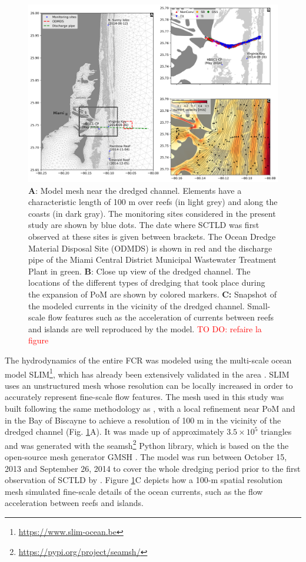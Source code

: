 \documentclass[preprint,12pt,authoryear]{elsarticle}
\newcommand{\todo}[1]{\textcolor{red}{TO DO: #1}}
\begin{document}
\begin{figure}
    \centering
    \includegraphics[width=\textwidth]{figures/fig_mesh_onset.png}
    \caption{\textbf{A}: Model mesh near the dredged channel. Elements have a characteristic length of 100 m over reefs (in light grey) and along the coasts (in dark gray). The monitoring sites considered in the present study are shown by blue dots. The date where SCTLD was first observed at these sites is given between brackets. The Ocean Dredge Material Disposal Site (ODMDS) is shown in red and the discharge pipe of the Miami Central District Municipal Wastewater Treatment Plant in green. \textbf{B}: Close up view of the dredged channel. The locations of the different types of dredging that took place during the expansion of PoM are shown by colored markers. \textbf{C:} Snapshot of the modeled currents in the vicinity of the dredged channel. Small-scale flow features such as the acceleration of currents between reefs and islands are well reproduced by the model. \todo{refaire la figure}}
    \label{fig:onset_mesh}
\end{figure}

The hydrodynamics of the entire FCR was modeled using the multi-scale ocean model SLIM\footnote{\url{ https://www.slim-ocean.be}}, which has already been extensively validated in the area \citep{frys20,dobbelaere2020coupled,dobbelaere2022}. SLIM uses an unstructured mesh whose resolution can be locally increased in order to accurately represent fine-scale flow features. The mesh used in this study was built following the same methodology as \cite{dobbelaere2022}, with a local refinement near PoM and in the Bay of Biscayne to achieve a resolution of 100 m in the vicinity of the dredged channel (Fig. \ref{fig:onset_mesh}A). It was made up of approximately $3.5\times 10^5$ triangles and was generated with the seamsh\footnote{\url{https://pypi.org/project/seamsh/}} Python library, which is based on the the open-source mesh generator GMSH \citep{geuzaine2009gmsh}. The model was run between October 15, 2013 and September 26, 2014 to cover the whole dredging period prior to the first observation of SCTLD by \cite{precht2016unprecedented}. Figure \ref{fig:onset_mesh}C depicts how a 100-m spatial resolution mesh simulated fine-scale details of the ocean currents, such as the flow acceleration between reefs and islands.
\end{document}
